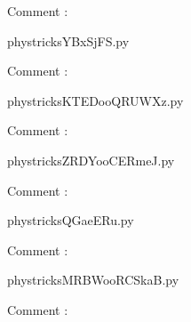     Comment : 

    \clearpage
    


    \newcommand{\CaptionFigYBxSjFS}{<+Type your caption here+>}
    \begin{center}
        
    \end{center}
    phystricksYBxSjFS.py

    Comment : 

    \clearpage
    


    \newcommand{\CaptionFigKTEDooQRUWXz}{<+Type your caption here+>}
    \begin{center}
        
    \end{center}
    phystricksKTEDooQRUWXz.py

    Comment : 

    \clearpage
    


    \newcommand{\CaptionFigZRDYooCERmeJ}{<+Type your caption here+>}
    \begin{center}
        
    \end{center}
    phystricksZRDYooCERmeJ.py

    Comment : 

    \clearpage
    


    \newcommand{\CaptionFigQGaeERu}{<+Type your caption here+>}
    \begin{center}
        
    \end{center}
    phystricksQGaeERu.py

    Comment : 

    \clearpage
    


    \newcommand{\CaptionFigMRBWooRCSkaB}{<+Type your caption here+>}
    \begin{center}
        
    \end{center}
    phystricksMRBWooRCSkaB.py

    Comment : 

    \clearpage
    

